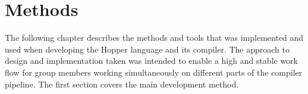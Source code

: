 \chapter{Methods}



The following chapter describes the methods and tools that was implemented and used when developing the Hopper language and its compiler. The approach to design and implementation taken was intended to enable a high and stable work flow for group members working simultaneously on different parts of the compiler pipeline. The first section covers the main development method.





